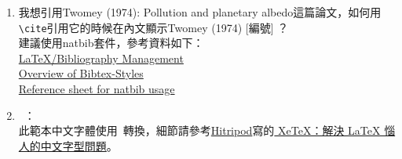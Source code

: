 \begin{acknowledgementsCH}
\begin{enumerate}[leftmargin=0pt, topsep=0pt, itemsep=0pt, label=\Roman{*}.]
\begin{enumerate}[topsep=0pt, itemsep=0pt, label=$\bullet$]
    \begin{verbatim}
\RequirePackage[top=3cm,left=3cm,bottom=2cm,right=3cm]{geometry}
    \end{verbatim}
    \item 我想引用Twomey (1974): Pollution and planetary albedo這篇論文，如何用\texttt{\textbackslash cite}引用它的時候在內文顯示Twomey (1974) [編號] ？\\
    建議使用natbib套件，參考資料如下：\\
    \href{http://en.wikibooks.org/wiki/LaTeX/Bibliography_Management}{LaTeX/Bibliography Management}\\
    \href{http://nodonn.tipido.net/bibstyle.php}{Overview of Bibtex-Styles}\\
    \href{http://merkel.zoneo.net/Latex/natbib.php}{Reference sheet for natbib usage }\\
 \item \XeTeX\ ：\\
    此範本中文字體使用\XeTeX\ 轉換，細節請參考\href{http://www.hitripod.com/blog/}{Hitripod}寫的\href{http://www.hitripod.com/blog/2011/04/xetex-chinese-font-cjk-latex/}{ 
XeTeX：解決 LaTeX 惱人的中文字型問題}。
    \end{enumerate} 
    \end{enumerate} 


 \end{acknowledgementsCH}